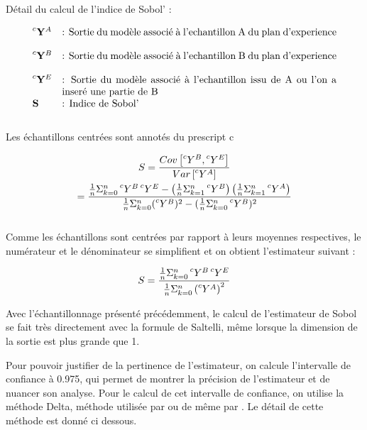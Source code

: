 \documentclass[a4paper,10pt]{article}
\begin{document}
Détail du calcul de l'indice de Sobol' :

   \[
      \begin{array}{lp{0.8\linewidth}}
        \prescript{c}{}{\mathbf{Y}}^{A}   & : Sortie du modèle associé à l'echantillon A du plan d'experience \\
        \prescript{c}{}{\mathbf{Y}}^{B}   & : Sortie du modèle associé à l'echantillon B du plan d'experience \\
        \prescript{c}{}{\mathbf{Y}}^{E}   & : Sortie du modèle associé à l'echantillon issu de A ou l'on a inseré une partie de B \\
         \mathbf{S} 					  & : Indice de Sobol' \\
      \end{array}
   \]\\
\* Les échantillons centrées sont annotés du prescript c \*

   \begin{gather}   
S = \frac{Cov\left[\prescript{c}{}{Y}^{B},\prescript{c}{}{Y}^{E}\right]}{Var\left[\prescript{c}{}{Y}^{A}\right]} \\
= \frac{\frac{1}{n}\Sigma_{k=0}^{n}\prescript{c}{}{Y}^{B}\prescript{c}{}{Y}^{E} - \left(\frac{1}{n}\Sigma_{k=1}^{n}\prescript{c}{}{Y}^{B}\right)\left(\frac{1}{n}\Sigma_{k=1}^{n}\prescript{c}{}{Y}^{A}\right)}{\frac{1}{n}\Sigma_{k=0}^{n}(\prescript{c}{}{Y}^{B})^{2}-(\frac{1}{n}\Sigma_{k=0}^{n}\prescript{c}{}{Y}^{B})^{2}}
   \end{gather}\\
   
Comme les échantillons sont centrées par rapport à leurs moyennes respectives, le numérateur et le dénominateur se simplifient et on obtient l’estimateur suivant :

	\begin{equation}
		S = \frac{\frac{1}{n}\Sigma_{k=0}^{n}\prescript{c}{}{Y}^{B}\prescript{c}{}{Y}^{E}}{\frac{1}{n}\Sigma_{k=0}^{n}\left(\prescript{c}{}{Y}^{A}\right)^{2}}
	\end{equation}


Avec l'échantillonnage présenté précédemment, le calcul de l'estimateur de Sobol se fait très directement avec la formule de Saltelli, même lorsque la dimension de la sortie est plus grande que 1.

Pour pouvoir justifier de la pertinence de l'estimateur, on calcule l'intervalle de confiance à 0.975, qui permet de montrer la précision de l'estimateur et de nuancer son analyse. Pour le calcul de cet intervalle de confiance, on utilise la méthode Delta, méthode utilisée par \cite{janon_klein_lagnoux_nodet_prieur_2014} ou de même par \cite{dumas2017}. Le détail de cette méthode est donné ci dessous.
\end{document}
